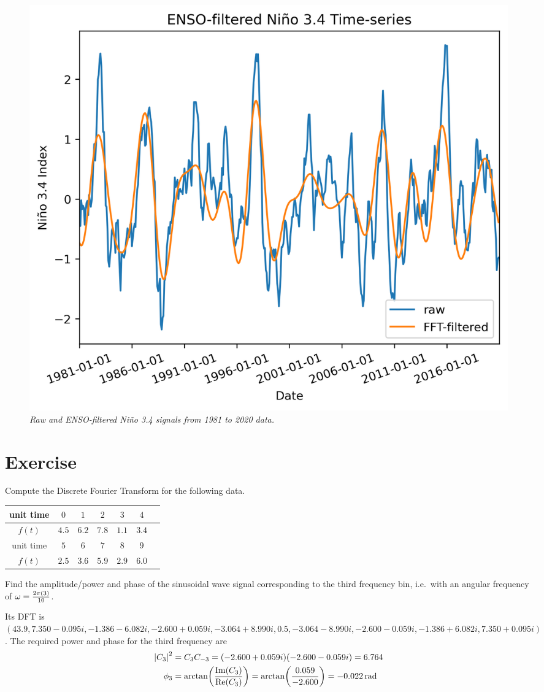 \begin{figure}[ht!]
    \centering
    \includegraphics[scale=0.75]{graphics/NinoENSOFilter.png}
    \caption{\textit{Raw and ENSO-filtered Niño 3.4 signals from 1981 to 2020 data.}}
    \label{fig:nino2}
\end{figure}

\section{Exercise}
\begin{Exercise}
Compute the Discrete Fourier Transform for the following data.
\begin{center}
\begin{tabular}{|c|c|c|c|c|c|c|}
\hline
unit time & $0$ & $1$ & $2$ & $3$ & $4$ \\
\hline
$f(t)$ & $4.5$ & $6.2$ & $7.8$ & $1.1$ & $3.4$  \\
\hline
unit time & $5$ & $6$ & $7$ & $8$ & $9$ \\
\hline
$f(t)$ & $2.5$ & $3.6$ & $5.9$ & $2.9$ & $6.0$ \\
\hline
\end{tabular}
\end{center}
Find the amplitude/power and phase of the sinusoidal wave signal corresponding to the third frequency bin, i.e.\ with an angular frequency of $\omega = \smash{\frac{2\pi(3)}{10}}$. 
\end{Exercise}
\begin{Answer}
Its DFT is $(43.9, 7.350-0.095i, -1.386-6.082i, -2.600+0.059i, -3.064+8.990i, 0.5,  -3.064-8.990i, -2.600-0.059i, -1.386+6.082i, \allowbreak 7.350+0.095i)$. The required power and phase for the third frequency are 
\begin{align*}
\abs{C_3}^2 &= C_3C_{-3} = (-2.600+0.059i)(-2.600-0.059i) = 6.764 \\
\phi_3 &= \arctan(\frac{\Im(C_3)}{\Re(C_3)}) = \arctan(\frac{0.059}{-2.600}) = \SI{-0.022}{\radian}
\end{align*}
\end{Answer}

